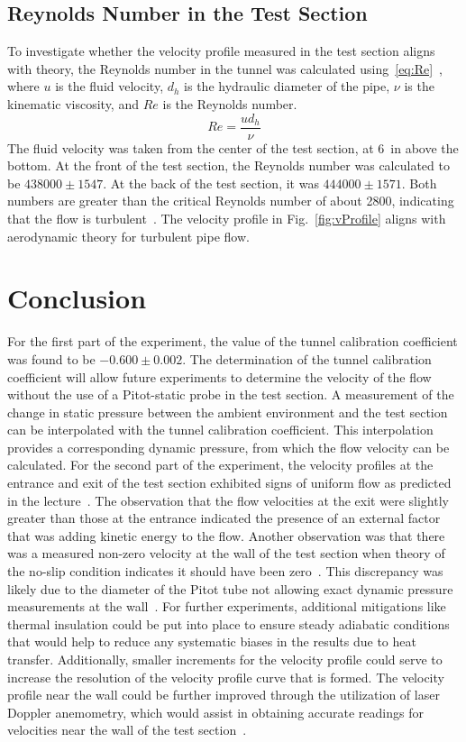 \documentclass[journal,letterpaper]{IEEEtran}
\begin{document}
\subsection{Reynolds Number in the Test Section}

To investigate whether the velocity profile measured in the test section aligns with theory, the Reynolds number in the tunnel was calculated using~\eqref{eq:Re}~\cite{HeatTransfer}, where $u$ is the fluid velocity, $d_h$ is the hydraulic diameter of the pipe, $\nu$ is the kinematic viscosity, and $Re$ is the Reynolds number.
\begin{equation} \label{eq:Re}
    Re = \frac{ud_h}{\nu}
\end{equation}
The fluid velocity was taken from the center of the test section, at \qty{6}{in} above the bottom.
At the front of the test section, the Reynolds number was calculated to be $438000 \pm 1547$. At the back of the test section, it was $444000 \pm 1571$. Both numbers are greater than the critical Reynolds number of about 2800, indicating that the flow is turbulent~\cite{HeatTransfer}. The velocity profile in Fig.~\ref{fig:vProfile} aligns with aerodynamic theory for turbulent pipe flow.


\section{Conclusion}


For the first part of the experiment, the value of the tunnel calibration coefficient was found to be $-0.600 \pm 0.002$.
The determination of the tunnel calibration coefficient will allow future experiments to determine the velocity of the flow without the use of a Pitot-static probe in the test section.
A measurement of the change in static pressure between the ambient environment and the test section can be interpolated with the tunnel calibration coefficient.
This interpolation provides a corresponding dynamic pressure, from which the flow velocity can be calculated.
For the second part of the experiment, the velocity profiles at the entrance and exit of the test section exhibited signs of uniform flow as predicted in the lecture~\cite{lecture}.
The observation that the flow velocities at the exit were slightly greater than those at the entrance indicated the presence of an external factor that was adding kinetic energy to the flow.
Another observation was that there was a measured non-zero velocity at the wall of the test section when theory of the no-slip condition indicates it should have been zero~\cite{Aero}.
This discrepancy was likely due to the diameter of the Pitot tube not allowing exact dynamic pressure measurements at the wall~\cite{Aero}.
For further experiments, additional mitigations like thermal insulation could be put into place to ensure steady adiabatic conditions that would help to reduce any systematic biases in the results due to heat transfer.
Additionally, smaller increments for the velocity profile could serve to increase the resolution of the velocity profile curve that is formed.
The velocity profile near the wall could be further improved through the utilization of laser Doppler anemometry, which would assist in obtaining accurate readings for velocities near the wall of the test section~\cite{PitotLecture}.  
\end{document}
